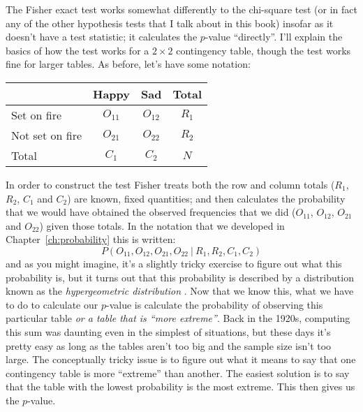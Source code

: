 The Fisher exact test works somewhat differently to the chi-square test (or in fact any of the other hypothesis tests that I talk about in this book) insofar as it doesn't have a test statistic; it calculates the $p$-value ``directly''. I'll explain the basics of how the test works for a $2 \times 2$ contingency table, though the test works fine for larger tables. As before, let's have some notation: 

\begin{center}
\begin{tabular}{l|cc|c}
& Happy & Sad & Total \\ \hline
Set on fire   & $O_{11}$ & $O_{12}$ & $R_{1}$ \\
Not set on fire & $O_{21}$ & $O_{22}$ & $R_{2}$ \\ \hline
Total & $C_{1}$ & $C_{2}$ & $N$
\end{tabular}
\end{center}

\noindent
In order to construct the test Fisher treats both the row and column totals ($R_1$, $R_2$, $C_1$ and $C_2$) are known, fixed quantities; and then calculates the probability that we would have obtained the observed frequencies that we did ($O_{11}$, $O_{12}$, $O_{21}$ and $O_{22}$) given those totals. In the notation that we developed in Chapter~\ref{ch:probability} this is written:
$$
P(O_{11}, O_{12}, O_{21}, O_{22} \ | \ R_1, R_2, C_1, C_2) 
$$
and as you might imagine, it's a slightly tricky exercise to figure out what this probability is, but it turns out that this probability is described by a distribution known as the {\it hypergeometric distribution} . Now that we know this, what we have to do to calculate our $p$-value is calculate the probability of observing this particular table {\it or a table that is ``more extreme''}. Back in the 1920s, computing this sum was daunting even in the simplest of situations, but these days it's pretty easy as long as the tables aren't too big and the sample size isn't too large. The conceptually tricky issue is to figure out what it means to say that one contingency table is more ``extreme'' than another. The easiest solution is to say that the table with the lowest probability is the most extreme. This then gives us the $p$-value. 

